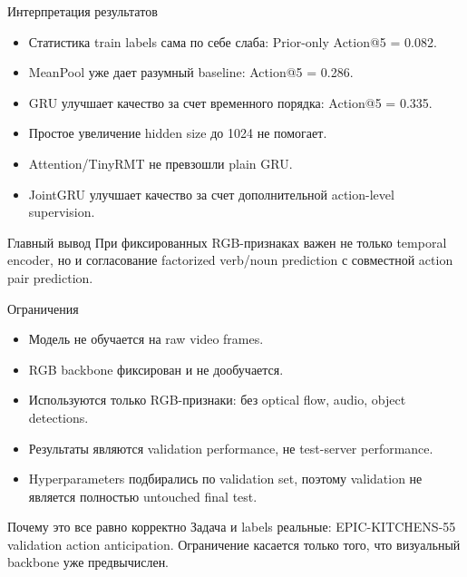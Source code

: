 \documentclass[aspectratio=169,10pt]{beamer}
\begin{document}
\begin{frame}{Интерпретация результатов}
    \begin{itemize}
        \item Статистика train labels сама по себе слаба: Prior-only Action@5 = 0.082.
        \item MeanPool уже дает разумный baseline: Action@5 = 0.286.
        \item GRU улучшает качество за счет временного порядка: Action@5 = 0.335.
        \item Простое увеличение hidden size до 1024 не помогает.
        \item Attention/TinyRMT не превзошли plain GRU.
        \item JointGRU улучшает качество за счет дополнительной action-level supervision.
    \end{itemize}

    \vspace{0.2cm}
    \begin{block}{Главный вывод}
        При фиксированных RGB-признаках важен не только temporal encoder, но и согласование factorized verb/noun prediction с совместной action pair prediction.
    \end{block}
\end{frame}

\begin{frame}{Ограничения}
    \begin{itemize}
        \item Модель не обучается на raw video frames.
        \item RGB backbone фиксирован и не дообучается.
        \item Используются только RGB-признаки: без optical flow, audio, object detections.
        \item Результаты являются validation performance, не test-server performance.
        \item Hyperparameters подбирались по validation set, поэтому validation не является полностью untouched final test.
    \end{itemize}

    \vspace{0.25cm}
    \begin{block}{Почему это все равно корректно}
        Задача и labels реальные: EPIC-KITCHENS-55 validation action anticipation. Ограничение касается только того, что визуальный backbone уже предвычислен.
    \end{block}
\end{frame}
\end{document}
